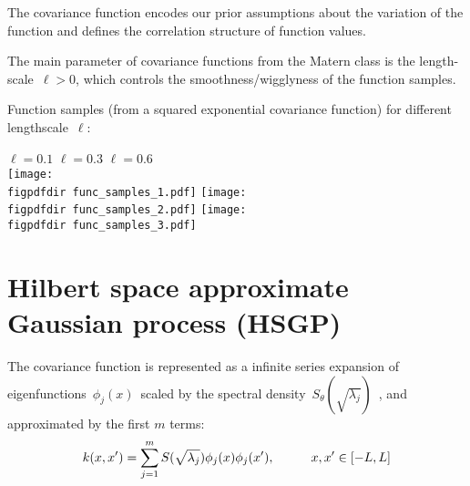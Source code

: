 \documentclass[landscape,a1,final]{a0poster} %
\let\tempone\itemize
\let\temptwo\enditemize
\renewenvironment{itemize}{\tempone\addtolength{\itemsep}{-0.3\baselineskip}}{\temptwo}
\def\figpdfdir{fig/} %
\begin{document}
\begin{minipage}{1\linewidth}
\begin{minipage}[t]{0.31\linewidth}
\begin{itemize}
\item The covariance function encodes our prior assumptions about the variation of the function and defines the {\color{navyblue} correlation structure} of function values.

\item The main parameter of covariance functions from the Matern class is the {\color{navyblue} length-scale}\, $\ell > 0$, which controls the {\color{navyblue} smoothness/wigglyness} of the function samples.

\item Function samples {\scriptsize(from a squared exponential covariance function)} for different lengthscale\, $\ell$:\: 

\hspace{45mm} $\ell=0.1$ \hspace{63mm} $\ell=0.3$ \hspace{64mm} $\ell=0.6$\\
\texttt{[image: \\figpdfdir func\_samples\_1.pdf]}
\texttt{[image: \\figpdfdir func\_samples\_2.pdf]}
\texttt{[image: \\figpdfdir func\_samples\_3.pdf]}

\end{itemize}


\end{minipage}%
\hspace{0.015\linewidth} 
\begin{minipage}[t]{0.31\textwidth}
\vspace{0pt}
\setlength{\parindent}{10mm}


\vspace{0.3cm}
\section{Hilbert space approximate Gaussian process (HSGP)}
\vspace{-0.2cm}

\begin{itemize}\setlength\itemsep{3mm}

\item The covariance function is represented as a {\color{navyblue} infinite series expansion} of eigenfunctions\, $\phi_j(x)$\, scaled by the spectral density\, $S_{\theta}(\sqrt{\lambda_j})$\, {\color{darkgray} \citep{solin2018hilbert}}, and {\color{navyblue} approximated by the first $m$ terms}:
%
\begin{align*}
k(x,x') = \sum_{j=1}^m S(\sqrt{\lambda_j}) \phi_j(x) \phi_j(x'), \hspace{10mm} x,x' \in [-L,L]
\end{align*} 


\end{itemize}
\end{minipage}
\end{minipage}
\end{document}
